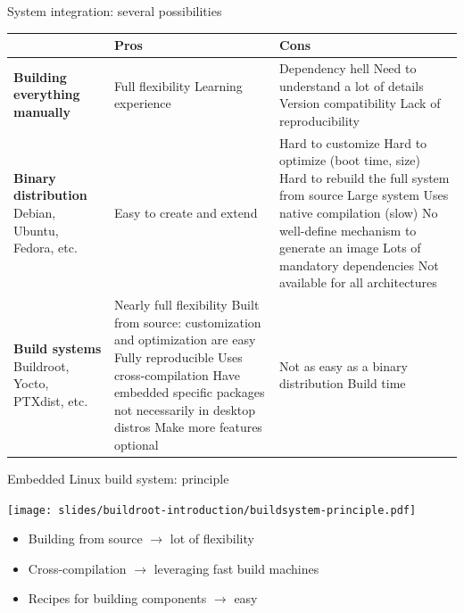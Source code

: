 \begin{frame}{System integration: several possibilities}
  \tiny
  \begin{tabularx}{11cm}{|X|X|X|}
    \hline
    & {\bf Pros} & {\bf Cons} \\
    \hline
    {\bf Building everything manually} &
    Full flexibility \newline
    Learning experience &
    Dependency hell \newline
    Need to understand a lot of details \newline
    Version compatibility \newline
    Lack of reproducibility \\
    \hline
    {\bf Binary distribution} \newline Debian, Ubuntu, Fedora, etc.
    &
    Easy to create and extend
    &
    Hard to customize \newline
    Hard to optimize (boot time, size) \newline
    Hard to rebuild the full system from source \newline
    Large system \newline
    Uses native compilation (slow) \newline
    No well-define mechanism to generate an image \newline
    Lots of mandatory dependencies \newline
    Not available for all architectures \\
    \hline
    {\bf Build systems} \newline Buildroot, Yocto, PTXdist, etc.
    &
    Nearly full flexibility \newline
    Built from source: customization and optimization are easy \newline
    Fully reproducible \newline
    Uses cross-compilation \newline
    Have embedded specific packages not necessarily in desktop distros \newline
    Make more features optional
    &
    Not as easy as a binary distribution \newline
    Build time \\
    \hline
  \end{tabularx}
\end{frame}

\begin{frame}{Embedded Linux build system: principle}
  \begin{center}
    \texttt{[image: slides/buildroot-introduction/buildsystem-principle.pdf]}
  \end{center}
  \begin{itemize}
  \item Building from source $\rightarrow$ lot of flexibility
  \item Cross-compilation $\rightarrow$ leveraging fast build machines
  \item Recipes for building components $\rightarrow$ easy
  \end{itemize}
\end{frame}

